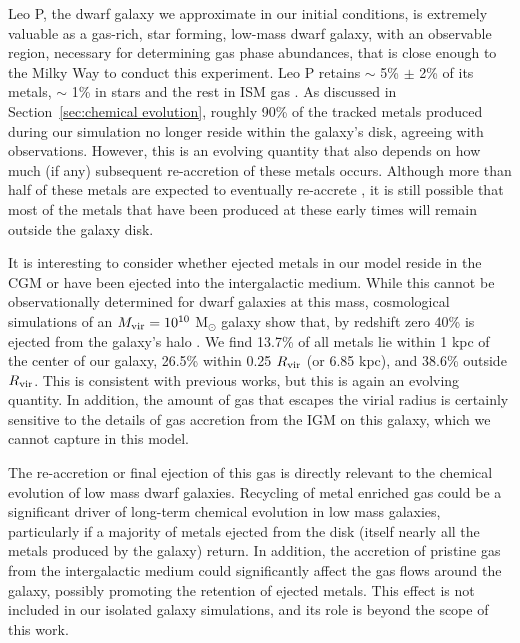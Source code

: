 \documentclass[twocolumn]{aastex61}
\begin{document}
Leo P, the dwarf galaxy we approximate in our initial conditions, is extremely valuable as a gas-rich,
star forming, low-mass dwarf galaxy, with an observable  region, necessary for determining gas phase abundances, that is close enough to the Milky Way to conduct this experiment. Leo P retains $\sim$ 5\% $\pm$ 2\% of its metals, $\sim$ 1\% in stars and the rest in ISM gas \citep{McQuinn2015}. As discussed in Section~\ref{sec:chemical evolution}, roughly 90\% of the tracked metals produced during our simulation no longer reside within the galaxy's disk, agreeing with observations. However, this is an evolving quantity that also depends on how much (if any) subsequent re-accretion of these metals occurs. Although more than half of these metals are expected to eventually re-accrete \citep{Angles-Alcazar2017}, it is still possible that most of the metals that have been produced at these early times will remain outside the galaxy disk.

It is interesting to consider whether ejected metals in our model reside in the CGM or have been ejected into the intergalactic medium. While this cannot be observationally determined for dwarf galaxies at this mass, cosmological simulations of an $M_{\rm vir} = 10^{10}$ M$_{\odot}$ galaxy show that, by redshift zero 40\% is ejected from the galaxy's halo \citep{Angles-Alcazar2017}. We find 13.7\% of all metals lie within 1 kpc of the center of our galaxy, 26.5\% within 0.25 $R_{\rm vir}$ (or 6.85 kpc), and 38.6\% outside $R_{\rm vir}$. This is consistent with previous works, but this is again an evolving quantity. In addition, the amount of gas that escapes the virial radius is certainly sensitive to the details of gas accretion from the IGM on this galaxy, which we cannot capture in this model.

The re-accretion or final ejection of this gas is directly relevant to the chemical evolution of low mass dwarf galaxies. Recycling of metal enriched gas could be a significant driver of long-term chemical evolution in low mass galaxies, particularly if a majority of metals ejected from the disk (itself nearly all the metals produced by the galaxy) return. In addition, the accretion of pristine gas from the intergalactic medium could significantly affect the gas flows around the galaxy, possibly promoting the retention of ejected metals. This effect is not included in our isolated galaxy simulations, and its role is beyond the scope of this work.
\end{document}
